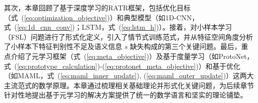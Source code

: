 其次，本章回顾了基于深度学习的RATR框架，包括优化目标（式~(\ref{eq:optimization_objective})）和典型模型（如1D-CNN，式~(\ref{eq:1d_cnn_conv})；LSTM，式~(\ref{eq:lstm_h})）。接着，对小样本学习（FSL）问题进行了形式化定义，引入了情节式训练范式，并从特征空间角度分析了小样本下特征判别性不足及语义信息 $s$ 缺失构成的第三个关键问题。最后，重点介绍了元学习框架（式~(\ref{eq:meta_objective})）及基于度量学习（如ProtoNet，式~(\ref{eq:prototype_calculation})-(\ref{eq:protonet_meta_objective})）和基于优化（如MAML，式~(\ref{eq:maml_inner_update}), (\ref{eq:maml_outer_update})）这两大主流范式的数学原理。本章通过梳理相关基础理论并形式化关键问题，为后续章节针对性地提出基于元学习的解决方案提供了统一的数学语言和坚实的理论铺垫。